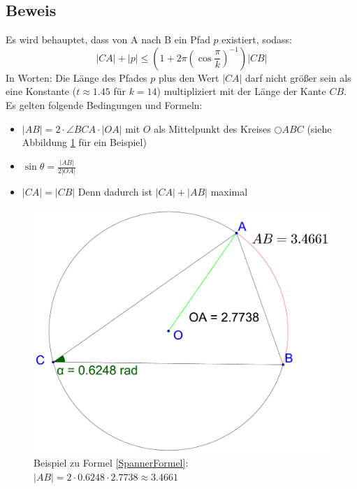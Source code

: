\documentclass[a4paper,twoside]{IEEEtran}
\begin{document}
\subsection{Beweis}
Es wird behauptet, dass von A nach B ein Pfad $p $ existiert, sodass:
\begin{equation}
|CA| + |p| \leq (1+2\pi(\cos{\frac{\pi}{k}})^{-1})|CB|
\end{equation} \label{SpannerFormel}
In Worten: Die Länge des Pfades $p $ plus den Wert $|CA| $ darf nicht größer sein als eine Konstante ($t \approx 1.45 $ für $k=14 $) multipliziert mit der Länge der Kante $CB $.
Es gelten folgende Bedingungen und Formeln:
\begin{itemize}
\item $|AB| = 2\cdot \angle{BCA} \cdot |OA| $ mit $O $ als Mittelpunkt des Kreises $\bigcirc{ABC} $ (siehe Abbildung \ref{fig:winkel_mal_strecke} für ein Beispiel)
\item $\sin{\theta}=\frac{|AB|}{2|OA|} $ %
\item $|CA|=|CB| $ Denn dadurch ist $|CA| + |AB| $ maximal%
\end{itemize}

\begin{figure}[h!]
\centering
\includegraphics[width=1\linewidth]{bogen_gleich_winkel_mal_strecke.eps}
\caption{Beispiel zu Formel \ref{SpannerFormel}: $|AB| = 2\cdot 0.6248 \cdot 2.7738 \approx 3.4661 $} %
\label{fig:winkel_mal_strecke}
\end{figure}
\end{document}
